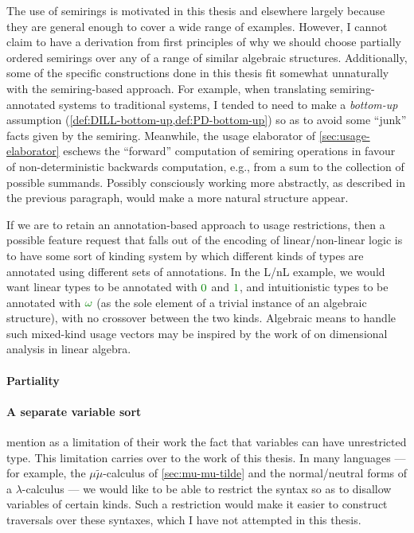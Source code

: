 The use of semirings is motivated in this thesis and elsewhere largely because
they are general enough to cover a wide range of examples.
However, I cannot claim to have a derivation from first principles of why we
should choose partially ordered semirings over any of a range of similar
algebraic structures.
Additionally, some of the specific constructions done in this thesis fit
somewhat unnaturally with the semiring-based approach.
For example, when translating semiring-annotated systems to traditional systems,
I tended to need to make a \emph{bottom-up} assumption
(\cref{def:DILL-bottom-up,def:PD-bottom-up}) so as to avoid some ``junk'' facts
given by the semiring.
Meanwhile, the usage elaborator of \cref{sec:usage-elaborator} eschews the
``forward'' computation of semiring operations in favour of non-deterministic
backwards computation, e.g., from a sum to the collection of possible summands.
Possibly consciously working more abstractly, as described in the previous
paragraph, would make a more natural structure appear.

If we are to retain an annotation-based approach to usage restrictions, then a
possible feature request that falls out of the encoding of linear/non-linear
logic is to have some sort of kinding system by which different kinds of types
are annotated using different sets of annotations.
In the L/nL example, we would want linear types to be annotated with $\gr0$ and
$\gr1$, and intuitionistic types to be annotated with $\gr\omega$ (as the sole
element of a trivial instance of an algebraic structure), with no crossover
between the two kinds.
Algebraic means to handle such mixed-kind usage vectors may be inspired by the
work of \citet{Hart95,MF21} on dimensional analysis in linear algebra.

\paragraph{Partiality}\label{sec:part}


\paragraph{A separate variable sort}
 mention as a limitation of their work the fact that variables
can have unrestricted type.
This limitation carries over to the work of this thesis.
In many languages --- for example, the $\mu\tilde\mu$-calculus of
\cref{sec:mu-mu-tilde} and the normal/neutral forms of a $\lambda$-calculus ---
we would like to be able to restrict the syntax so as to disallow variables of
certain kinds.
Such a restriction would make it easier to construct traversals over these
syntaxes, which I have not attempted in this thesis.

